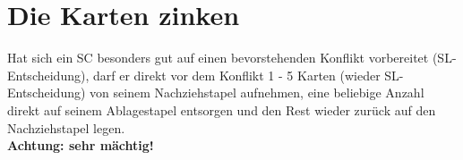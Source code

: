 \section{Die Karten zinken}
Hat sich ein SC besonders gut auf einen bevorstehenden Konflikt vorbereitet (SL-Entscheidung), darf er direkt vor dem Konflikt 1 - 5 Karten (wieder SL-Entscheidung) von seinem Nachziehstapel aufnehmen, eine beliebige Anzahl direkt auf seinem Ablagestapel entsorgen und den Rest wieder zurück auf den Nachziehstapel legen.
\\
\textbf{Achtung: sehr mächtig!}

